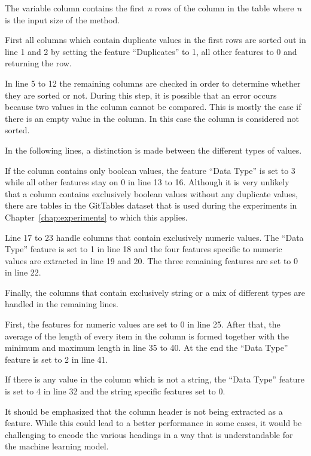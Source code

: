 The variable column contains the first \textit{n} rows of the column in the table where \textit{n} is the input size of the method.

First all columns which contain duplicate values in the first rows are sorted out in line 1 and 2 by setting the feature \enquote{Duplicates} to \num{1}, all other features to \num{0} and returning the row.

In line 5 to 12 the remaining columns are checked in order to determine whether they are sorted or not. During this step, it is possible that an error occurs because two values in the column cannot be compared. This is mostly the case if there is an empty value in the column. In this case the column is considered not sorted.

In the following lines, a distinction is made between the different types of values.

If the column contains only boolean values, the feature \enquote{Data Type} is set to \num{3} while all other features stay on \num{0} in line 13 to 16. Although it is very unlikely that a column contains exclusively boolean values without any duplicate values, there are tables in the GitTables dataset that is used during the experiments in Chapter~\ref{chap:experiments} to which this applies.

Line 17 to 23 handle columns that contain exclusively numeric values. The \enquote{Data Type} feature is set to \num{1} in line 18 and the four features specific to numeric values are extracted in line 19 and 20. The three remaining features are set to \num{0} in line 22.

Finally, the columns that contain exclusively string or a mix of different types are handled in the remaining lines.

First, the features for numeric values are set to \num{0} in line 25. After that, the average of the length of every item in the column is formed together with the minimum and maximum length in line 35 to 40. At the end the \enquote{Data Type} feature is set to \num{2} in line 41.

If there is any value in the column which is not a string, the \enquote{Data Type} feature is set to \num{4} in line 32 and the string specific features set to \num{0}.

It should be emphasized that the column header is not being extracted as a feature. While this could lead to a better performance in some cases, it would be challenging to encode the various headings in a way that is understandable for the machine learning model.

